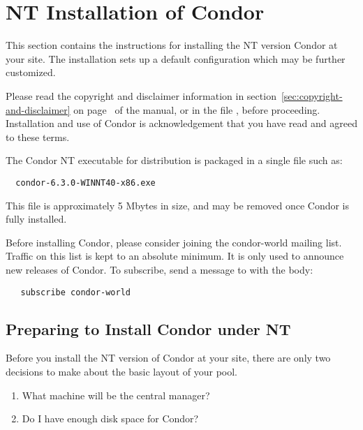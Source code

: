\section{\label{sec:NT-Install}NT Installation of Condor}

This section contains the instructions for installing the NT version
Condor at your site.  
The installation sets up a default configuration which
may be further customized.

Please read the copyright and disclaimer information in 
section~\ref{sec:copyright-and-disclaimer} on
page~\pageref{sec:copyright-and-disclaimer} of the manual, or in the
file 
, before proceeding.  Installation and
use of Condor is acknowledgement that you have read and agreed to these
terms.

The Condor NT executable for distribution is packaged in
a single file such as:
\begin{verbatim}
  condor-6.3.0-WINNT40-x86.exe
\end{verbatim}

This file is approximately 5 Mbytes in size, and may be
removed once Condor is fully installed.

Before installing Condor, please consider joining the condor-world mailing
list.  Traffic on this list is kept to an absolute minimum.  It is only
used to announce new releases of Condor.  To subscribe, send a message
to  with the body:
\begin{verbatim}
   subscribe condor-world 
\end{verbatim}

\subsection{\label{sec:NT-Preparing-to-Install}Preparing to Install
Condor under NT} 

Before you install the NT version of Condor at your site,
there are only two
decisions to make about the basic layout of your pool.

\begin{enumerate}
\item What machine will be the central manager?
\item Do I have enough disk space for Condor?
\end{enumerate}

